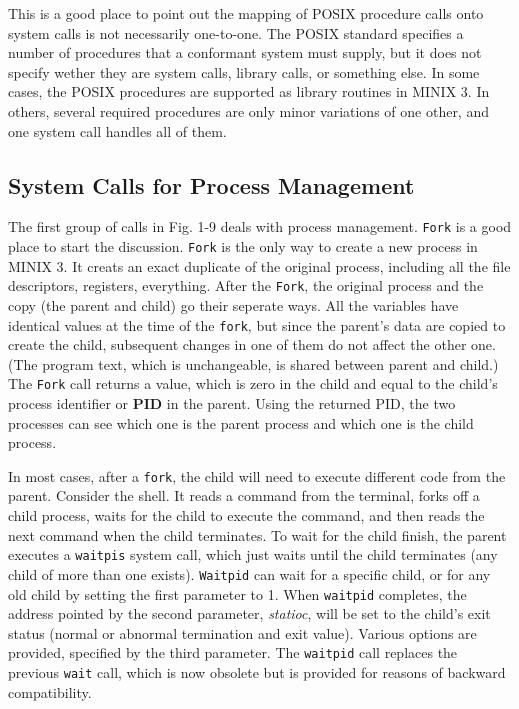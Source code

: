 \documentclass{book}
\newcommand {\kw}  [1] {\textbf{#1}}
\newcommand {\sys} [1] {\textsl{#1}}
\newcommand {\cmd} [1] {\texttt{#1}}
\begin{document}
This is a good place to point out the mapping of POSIX procedure calls onto system calls is not necessarily one-to-one.
The POSIX standard specifies a number of procedures that a conformant system must supply, 
but it does not specify wether they are system calls, library calls, or something else.
In some cases, the POSIX procedures are supported as library routines in MINIX 3.
In others, several required procedures are only minor variations of one other, and one system call handles all of them.

\subsection{System Calls for Process Management}
The first group of calls in Fig. 1-9 deals with process management.
\cmd{Fork} is a good place to start the discussion.
\cmd{Fork} is the only way to create a new process in MINIX 3.
It creats an exact duplicate of the original process, including all the file descriptors, registers, everything.
After the \cmd{Fork}, the original process and the copy (the parent and child) go their seperate ways.
All the variables have identical values at the time of the \cmd{fork}, but since the parent's data are copied to create the child, 
subsequent changes in one of them do not affect the other one.
(The program text, which is unchangeable, is shared between parent and child.)
The \cmd{Fork} call returns a value, which is zero in the child and equal to the child's process identifier or \kw{PID} in the parent.
Using the returned PID, the two processes can see which one is the parent process and which one is the child process.

In most cases, after a \cmd{fork}, the child will need to execute different code from the parent.
Consider the shell.
It reads a command from the terminal, forks off a child process, waits for the child to execute the command, 
and then reads the next command when the child terminates.
To wait for the child finish, the parent executes a \cmd{waitpis} system call, 
which just waits until the child terminates (any child of more than one exists).
\cmd{Waitpid} can wait for a specific child, or for any old child by setting the first parameter to 1.
When \cmd{waitpid} completes, the address pointed by the second parameter, \sys{statioc}, 
will be set to the child's exit status (normal or abnormal termination and exit value).
Various options are provided, specified by the third parameter.
The \cmd{waitpid} call replaces the previous \cmd{wait} call, which is now obsolete but is provided for reasons of backward compatibility.
\end{document}
